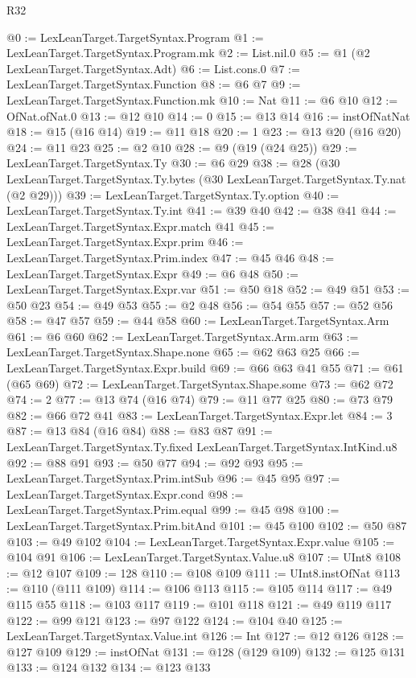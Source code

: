\begin{lexlean}{R32}
\begin{coremodule}
@0 := LexLeanTarget.TargetSyntax.Program
@1 := LexLeanTarget.TargetSyntax.Program.mk
@2 := List.nil.{0}
@5 := @1 (@2 LexLeanTarget.TargetSyntax.Adt)
@6 := List.cons.{0}
@7 := LexLeanTarget.TargetSyntax.Function
@8 := @6 @7
@9 := LexLeanTarget.TargetSyntax.Function.mk
@10 := Nat
@11 := @6 @10
@12 := OfNat.ofNat.{0}
@13 := @12 @10
@14 := 0
@15 := @13 @14
@16 := instOfNatNat
@18 := @15 (@16 @14)
@19 := @11 @18
@20 := 1
@23 := @13 @20 (@16 @20)
@24 := @11 @23
@25 := @2 @10
@28 := @9 (@19 (@24 @25))
@29 := LexLeanTarget.TargetSyntax.Ty
@30 := @6 @29
@38 := @28
    (@30 LexLeanTarget.TargetSyntax.Ty.bytes (@30 LexLeanTarget.TargetSyntax.Ty.nat (@2 @29)))
@39 := LexLeanTarget.TargetSyntax.Ty.option
@40 := LexLeanTarget.TargetSyntax.Ty.int
@41 := @39 @40
@42 := @38 @41
@44 := LexLeanTarget.TargetSyntax.Expr.match @41
@45 := LexLeanTarget.TargetSyntax.Expr.prim
@46 := LexLeanTarget.TargetSyntax.Prim.index
@47 := @45 @46
@48 := LexLeanTarget.TargetSyntax.Expr
@49 := @6 @48
@50 := LexLeanTarget.TargetSyntax.Expr.var
@51 := @50 @18
@52 := @49 @51
@53 := @50 @23
@54 := @49 @53
@55 := @2 @48
@56 := @54 @55
@57 := @52 @56
@58 := @47 @57
@59 := @44 @58
@60 := LexLeanTarget.TargetSyntax.Arm
@61 := @6 @60
@62 := LexLeanTarget.TargetSyntax.Arm.arm
@63 := LexLeanTarget.TargetSyntax.Shape.none
@65 := @62 @63 @25
@66 := LexLeanTarget.TargetSyntax.Expr.build
@69 := @66 @63 @41 @55
@71 := @61 (@65 @69)
@72 := LexLeanTarget.TargetSyntax.Shape.some
@73 := @62 @72
@74 := 2
@77 := @13 @74 (@16 @74)
@79 := @11 @77 @25
@80 := @73 @79
@82 := @66 @72 @41
@83 := LexLeanTarget.TargetSyntax.Expr.let
@84 := 3
@87 := @13 @84 (@16 @84)
@88 := @83 @87
@91 := LexLeanTarget.TargetSyntax.Ty.fixed LexLeanTarget.TargetSyntax.IntKind.u8
@92 := @88 @91
@93 := @50 @77
@94 := @92 @93
@95 := LexLeanTarget.TargetSyntax.Prim.intSub
@96 := @45 @95
@97 := LexLeanTarget.TargetSyntax.Expr.cond
@98 := LexLeanTarget.TargetSyntax.Prim.equal
@99 := @45 @98
@100 := LexLeanTarget.TargetSyntax.Prim.bitAnd
@101 := @45 @100
@102 := @50 @87
@103 := @49 @102
@104 := LexLeanTarget.TargetSyntax.Expr.value
@105 := @104 @91
@106 := LexLeanTarget.TargetSyntax.Value.u8
@107 := UInt8
@108 := @12 @107
@109 := 128
@110 := @108 @109
@111 := UInt8.instOfNat
@113 := @110 (@111 @109)
@114 := @106 @113
@115 := @105 @114
@117 := @49 @115 @55
@118 := @103 @117
@119 := @101 @118
@121 := @49 @119 @117
@122 := @99 @121
@123 := @97 @122
@124 := @104 @40
@125 := LexLeanTarget.TargetSyntax.Value.int
@126 := Int
@127 := @12 @126
@128 := @127 @109
@129 := instOfNat
@131 := @128 (@129 @109)
@132 := @125 @131
@133 := @124 @132
@134 := @123 @133

\end{coremodule}
\end{lexlean}
